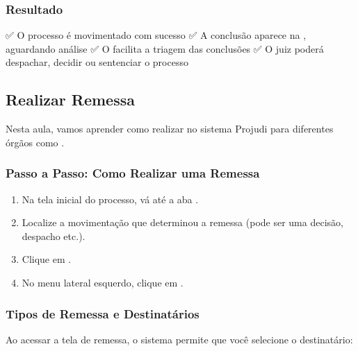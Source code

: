 \documentclass[letterpaper,10pt,brazil]{sphinxmanual}
\begin{document}
\subsubsection{Resultado}
\label{\detokenize{projud_35_enviarconcluso:resultado}}
\sphinxAtStartPar
✅ O processo é movimentado com sucesso
✅ A conclusão aparece na , aguardando análise
✅ O  facilita a triagem das conclusões
✅ O juiz poderá despachar, decidir ou sentenciar o processo

\sphinxstepscope


\subsection{Realizar Remessa}
\label{\detokenize{projud_36_realizarremessa:realizar-remessa}}\label{\detokenize{projud_36_realizarremessa::doc}}
\sphinxAtStartPar
Nesta aula, vamos aprender como realizar  no sistema Projudi para diferentes órgãos como .


\subsubsection{Passo a Passo: Como Realizar uma Remessa}
\label{\detokenize{projud_36_realizarremessa:passo-a-passo-como-realizar-uma-remessa}}\begin{enumerate}
%
\item {} 
\sphinxAtStartPar
Na tela inicial do processo, vá até a aba .

\item {} 
\sphinxAtStartPar
Localize a movimentação que determinou a remessa (pode ser uma decisão, despacho etc.).

\item {} 
\sphinxAtStartPar
Clique em .

\item {} 
\sphinxAtStartPar
No menu lateral esquerdo, clique em .

\end{enumerate}


\subsubsection{Tipos de Remessa e Destinatários}
\label{\detokenize{projud_36_realizarremessa:tipos-de-remessa-e-destinatarios}}
\sphinxAtStartPar
Ao acessar a tela de remessa, o sistema permite que você selecione o destinatário:
\end{document}
